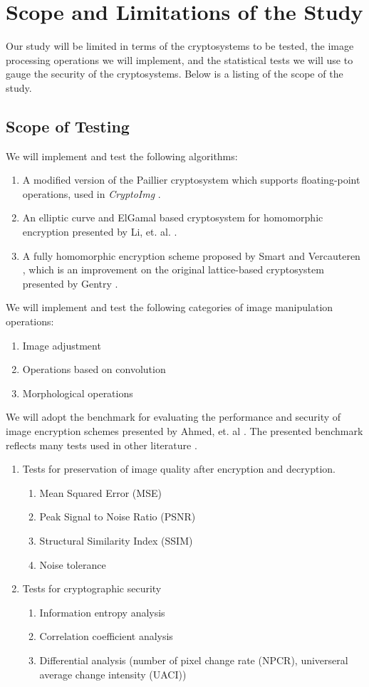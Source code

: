 \section{Scope and Limitations of the Study}
Our study will be limited in terms of the cryptosystems to be tested, the image processing operations we will implement, and the statistical tests we will use to gauge the security of the cryptosystems. Below is a listing of the scope of the study.

\subsection{Scope of Testing}
We will implement and test the following algorithms:
\begin{enumerate}
	\item A modified version of the Paillier cryptosystem \cite{} which supports floating-point operations, used in \textit{CryptoImg} \cite{ziad_cryptoimg:_2016}.
	\item An elliptic curve and ElGamal based cryptosystem for homomorphic encryption presented by Li, et. al. \cite{li_elliptic_2012}.
	\item A fully homomorphic encryption scheme proposed by Smart and Vercauteren \cite{hutchison_fully_2010}, which is an improvement on the original lattice-based cryptosystem presented by Gentry \cite{gentry_fully_2009}.
\end{enumerate}
We will implement and test the following categories of image manipulation operations:
\begin{enumerate}
	\item Image adjustment
	\item Operations based on convolution
	\item Morphological operations
\end{enumerate}
We will adopt the benchmark for evaluating the performance and security of image encryption schemes presented by Ahmed, et. al \cite{ahmed_benchmark_2016}. The presented benchmark reflects many tests used in other literature \cite{ahmad_efficiency_2012, wu_npcr_2011}.
\begin{enumerate}
	\item Tests for preservation of image quality after encryption and decryption.
	\begin{enumerate}
		\item Mean Squared Error (MSE)
		\item Peak Signal to Noise Ratio (PSNR)
		\item Structural Similarity Index (SSIM)
		\item Noise tolerance
	\end{enumerate}
	\item Tests for cryptographic security
	\begin{enumerate}
		\item Information entropy analysis
		\item Correlation coefficient analysis
		\item Differential analysis (number of pixel change rate (NPCR), universeral average change intensity (UACI))
	\end{enumerate}
\end{enumerate}
